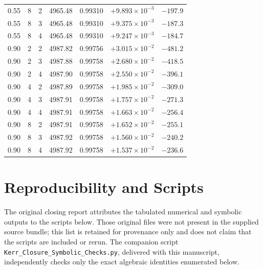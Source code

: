 \documentclass[11pt,a4paper]{article}
\theoremstyle{remark}
\theoremstyle{definition}
\begin{document}
\begin{table}[H]
\begin{tabular}{@{}rrrrrrr@{}}
0.55 & 8 & 2 & 4965.48 & 0.99310 & $+9.893\times10^{-3}$ & $-197.9$ \\
0.55 & 8 & 3 & 4965.48 & 0.99310 & $+9.375\times10^{-3}$ & $-187.3$ \\
0.55 & 8 & 4 & 4965.48 & 0.99310 & $+9.247\times10^{-3}$ & $-184.7$ \\
0.90 & 2 & 2 & 4987.82 & 0.99756 & $+3.015\times10^{-2}$ & $-481.2$ \\
0.90 & 2 & 3 & 4987.88 & 0.99758 & $+2.680\times10^{-2}$ & $-418.5$ \\
0.90 & 2 & 4 & 4987.90 & 0.99758 & $+2.550\times10^{-2}$ & $-396.1$ \\
0.90 & 4 & 2 & 4987.89 & 0.99758 & $+1.985\times10^{-2}$ & $-309.0$ \\
0.90 & 4 & 3 & 4987.91 & 0.99758 & $+1.757\times10^{-2}$ & $-271.3$ \\
0.90 & 4 & 4 & 4987.91 & 0.99758 & $+1.663\times10^{-2}$ & $-256.4$ \\
0.90 & 8 & 2 & 4987.91 & 0.99758 & $+1.652\times10^{-2}$ & $-255.1$ \\
0.90 & 8 & 3 & 4987.92 & 0.99758 & $+1.560\times10^{-2}$ & $-240.2$ \\
0.90 & 8 & 4 & 4987.92 & 0.99758 & $+1.537\times10^{-2}$ & $-236.6$ \\
\bottomrule
\end{tabular}
\end{table}

\section{Reproducibility and Scripts}
\label{sec:appB}

The original closing report attributes the tabulated numerical and symbolic outputs to the scripts below. Those original files were not present in the supplied source bundle; this list is retained for provenance only and does not claim that the scripts are included or rerun. The companion script \texttt{Kerr\_Closure\_Symbolic\_Checks.py}, delivered with this manuscript, independently checks only the exact algebraic identities enumerated below.
\end{document}
